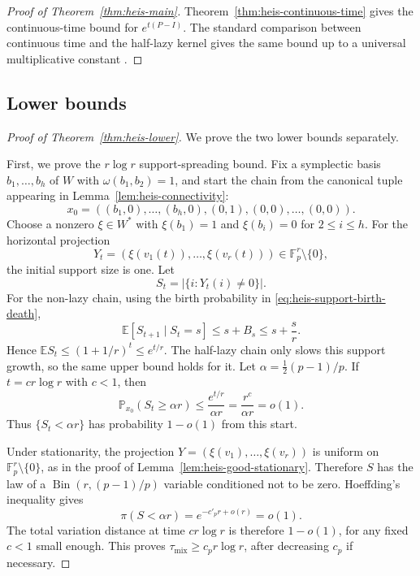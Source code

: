 \documentclass[11pt, reqno]{amsart}
\numberwithin{equation}{section}
\newcommand{\Fp}{\mathbb F_p}
\newcommand{\Prob}{\mathbb P}
\newcommand{\E}{\mathbb E}
\begin{document}
\begin{proof}[Proof of Theorem~\ref{thm:heis-main}]
Theorem~\ref{thm:heis-continuous-time} gives the continuous-time bound for
\(e^{t(P-I)}\).  The standard comparison between continuous time and the
half-lazy kernel gives the same bound up to a universal multiplicative constant
\cite[Theorem~20.3(ii)]{levin2017markov}.
\end{proof}

\subsection{Lower bounds}\label{subsec:heis-lower}

\begin{proof}[Proof of Theorem~\ref{thm:heis-lower}]
We prove the two lower bounds separately.

First, we prove the \(r\log r\) support-spreading bound.  Fix a symplectic
basis \(b_1,\ldots,b_h\) of \(W\) with \(\omega(b_1,b_2)=1\), and start the
chain from the canonical tuple appearing in Lemma~\ref{lem:heis-connectivity}:
\[
    x_0=((b_1,0),\ldots,(b_h,0),(0,1),(0,0),\ldots,(0,0)).
\]
Choose a nonzero \(\xi\in W^*\) with \(\xi(b_1)=1\) and
\(\xi(b_i)=0\) for \(2\le i\le h\).  For the horizontal projection
\[
    Y_t=(\xi(v_1(t)),\ldots,\xi(v_r(t)))\in\Fp^r\setminus\{0\},
\]
the initial support size is one.  Let
\[
    S_t=|\{i:Y_t(i)\ne0\}|.
\]
For the non-lazy chain, using the birth probability in
\eqref{eq:heis-support-birth-death},
\[
    \E[S_{t+1}\mid S_t=s]
    \le s+B_s\le s+\frac{s}{r}.
\]
Hence \(\E S_t\le(1+1/r)^t\le e^{t/r}\).  The half-lazy chain only slows this
support growth, so the same upper bound holds for it.  Let
\(\alpha=\frac12(p-1)/p\).  If \(t=c r\log r\) with \(c<1\), then
\[
    \Prob_{x_0}(S_t\ge\alpha r)
    \le \frac{e^{t/r}}{\alpha r}
    =\frac{r^c}{\alpha r}=o(1).
\]
Thus \(\{S_t<\alpha r\}\) has probability \(1-o(1)\) from this start.

Under stationarity, the projection \(Y=(\xi(v_1),\ldots,\xi(v_r))\) is uniform on
\(\Fp^r\setminus\{0\}\), as in the proof of Lemma~\ref{lem:heis-good-stationary}.
Therefore \(S\) has the law of a \(\operatorname{Bin}(r,(p-1)/p)\) variable
conditioned not to be zero.  Hoeffding's inequality gives
\[
    \pi(S<\alpha r)=e^{-c'_p r+o(r)}=o(1).
\]
The total variation distance at time \(c r\log r\) is therefore \(1-o(1)\), for
any fixed \(c<1\) small enough.  This proves
\(\tau_{\mathrm{mix}}\ge c_p r\log r\), after decreasing \(c_p\) if necessary.


\end{proof}
\end{document}
